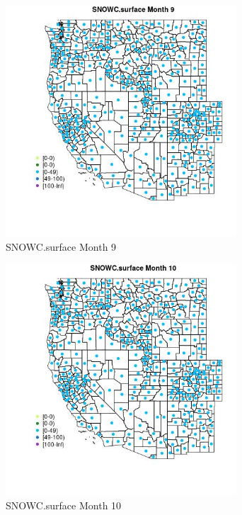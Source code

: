 \begin{figure} 
\centering  
\includegraphics[width=0.77\textwidth]{Code_Outputs/df_report_ML_predictors_CountyCentroid_Locations_Dates_2008-01-01to2018-12-31_MapObsMo9SNOWCsurface.jpg} 
\caption{\label{fig:df_report_ML_predictors_CountyCentroid_Locations_Dates_2008-01-01to2018-12-31MapObsMo9SNOWCsurface}SNOWC.surface Month 9} 
\end{figure} 
 

\begin{figure} 
\centering  
\includegraphics[width=0.77\textwidth]{Code_Outputs/df_report_ML_predictors_CountyCentroid_Locations_Dates_2008-01-01to2018-12-31_MapObsMo10SNOWCsurface.jpg} 
\caption{\label{fig:df_report_ML_predictors_CountyCentroid_Locations_Dates_2008-01-01to2018-12-31MapObsMo10SNOWCsurface}SNOWC.surface Month 10} 
\end{figure} 
 

